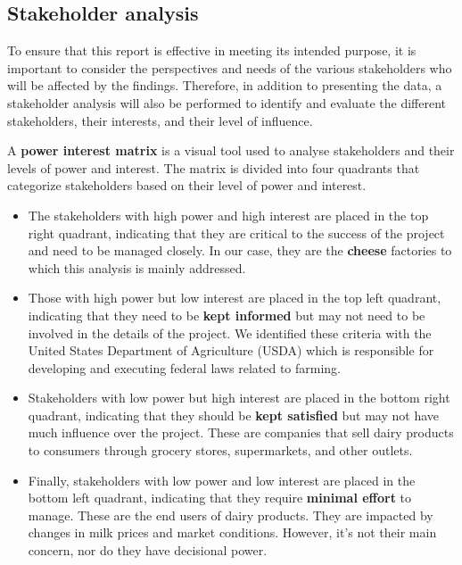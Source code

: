 \subsection{Stakeholder analysis}

To ensure that this report is effective in meeting its intended purpose, it is important to consider the perspectives and needs of the various stakeholders who will be affected by the findings. Therefore, in addition to presenting the data, a stakeholder analysis will also be performed to identify and evaluate the different stakeholders, their interests, and their level of influence. 


A \textbf{power interest matrix} is a visual tool used to analyse stakeholders and their levels of power and interest. The matrix is divided into four quadrants that categorize stakeholders based on their level of power and interest. 
\begin{itemize}
    \item The stakeholders with high power and high interest are placed in the top right quadrant, indicating that they are critical to the success of the project and need to be managed closely. In our case, they are the \textbf{cheese} factories to which this analysis is mainly addressed. 
    \item Those with high power but low interest are placed in the top left quadrant, indicating that they need to be \textbf{kept informed} but may not need to be involved in the details of the project. We identified these criteria with the United States Department of Agriculture (USDA) which is responsible for developing and executing federal laws related to farming. 
    \item Stakeholders with low power but high interest are placed in the bottom right quadrant, indicating that they should be \textbf{kept satisfied} but may not have much influence over the project. These are companies that sell dairy products to consumers through grocery stores, supermarkets, and other outlets.
    \item Finally, stakeholders with low power and low interest are placed in the bottom left quadrant, indicating that they require \textbf{minimal effort} to manage. These are the end users of dairy products. They are impacted by changes in milk prices and market conditions. However, it's not their main concern, nor do they have decisional power.
\end{itemize}


